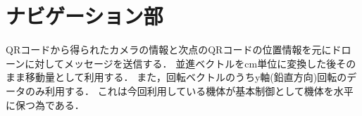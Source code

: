 \section{ナビゲーション部}
\label{proposed_navigation}
QRコードから得られたカメラの情報と次点のQRコードの位置情報を元にドローンに対してメッセージを送信する．
並進ベクトルをcm単位に変換した後そのまま移動量として利用する．
また，回転ベクトルのうちy軸(鉛直方向)回転のデータのみ利用する．
これは今回利用している機体が基本制御として機体を水平に保つ為である．
